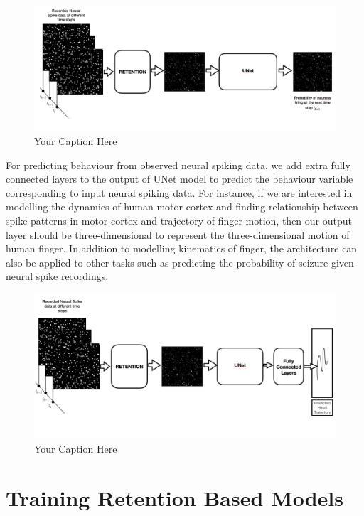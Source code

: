 \begin{figure}
  \centering
  \includegraphics[width=1.0\linewidth]{figures/retention_autoregressive.png}  
  \caption{Your Caption Here}
  \label{fig:your_label}  %
\end{figure}
For predicting behaviour from observed neural spiking data, we add extra fully connected layers to the output of UNet model to predict the behaviour variable corresponding to input neural spiking data. 
For instance, if we are interested in modelling the dynamics of human motor cortex and finding relationship between spike patterns in motor cortex and trajectory of finger motion, then our output layer should be three-dimensional to represent the three-dimensional motion of human finger. In addition to modelling kinematics of finger, the architecture can also be applied to other tasks such as predicting the probability of seizure given neural spike recordings. 


\begin{figure}
    \centering
    \includegraphics[width=1.0\linewidth]{figures/retention_spike_to_behavior.png}  
    \caption{Your Caption Here}
    \label{fig:your_label}  %
  \end{figure}

\section{Training Retention Based Models}



